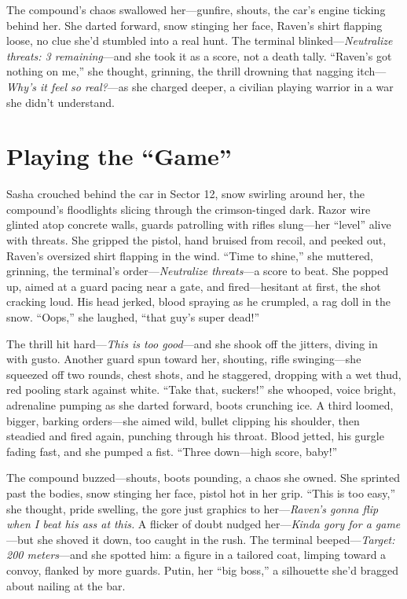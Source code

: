 \documentclass[12pt]{book}
\begin{document}
The compound’s chaos swallowed her—gunfire, shouts, the car’s engine ticking behind her. She darted forward, snow stinging her face, Raven’s shirt flapping loose, no clue she’d stumbled into a real hunt. The terminal blinked—\textit{Neutralize threats: 3 remaining}—and she took it as a score, not a death tally. “Raven’s got nothing on me,” she thought, grinning, the thrill drowning that nagging itch—\textit{Why’s it feel so real?}—as she charged deeper, a civilian playing warrior in a war she didn’t understand.

\section{Playing the ``Game''}

Sasha crouched behind the car in Sector 12, snow swirling around her, the compound’s floodlights slicing through the crimson-tinged dark. Razor wire glinted atop concrete walls, guards patrolling with rifles slung—her “level” alive with threats. She gripped the pistol, hand bruised from recoil, and peeked out, Raven’s oversized shirt flapping in the wind. “Time to shine,” she muttered, grinning, the terminal’s order—\textit{Neutralize threats}—a score to beat. She popped up, aimed at a guard pacing near a gate, and fired—hesitant at first, the shot cracking loud. His head jerked, blood spraying as he crumpled, a rag doll in the snow. “Oops,” she laughed, “that guy’s super dead!”

The thrill hit hard—\textit{This is too good}—and she shook off the jitters, diving in with gusto. Another guard spun toward her, shouting, rifle swinging—she squeezed off two rounds, chest shots, and he staggered, dropping with a wet thud, red pooling stark against white. “Take that, suckers!” she whooped, voice bright, adrenaline pumping as she darted forward, boots crunching ice. A third loomed, bigger, barking orders—she aimed wild, bullet clipping his shoulder, then steadied and fired again, punching through his throat. Blood jetted, his gurgle fading fast, and she pumped a fist. “Three down—high score, baby!”

The compound buzzed—shouts, boots pounding, a chaos she owned. She sprinted past the bodies, snow stinging her face, pistol hot in her grip. “This is too easy,” she thought, pride swelling, the gore just graphics to her—\textit{Raven’s gonna flip when I beat his ass at this.} A flicker of doubt nudged her—\textit{Kinda gory for a game}—but she shoved it down, too caught in the rush. The terminal beeped—\textit{Target: 200 meters}—and she spotted him: a figure in a tailored coat, limping toward a convoy, flanked by more guards. Putin, her “big boss,” a silhouette she’d bragged about nailing at the bar.
\end{document}
